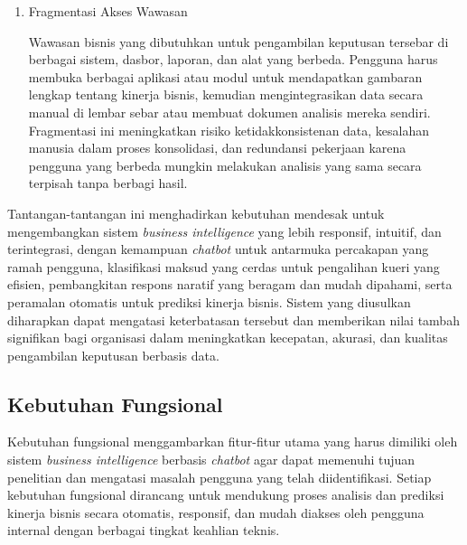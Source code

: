 \begin{enumerate}
Dasbor \textit{business intelligence} yang tersedia sering kali dirancang dengan asumsi bahwa pengguna memiliki pengetahuan teknis tentang struktur data, dimensi, metrik, dan terminologi basis data. Pengguna nonteknis, seperti manajer atau staf operasional yang tidak memiliki latar belakang teknis, sering merasa kesulitan dan kewalahan dengan berbagai tapis, daftar tarik, dan opsi yang tersedia. Antarmuka tidak intuitif, tidak mendukung kueri berbasis bahasa wajar, dan memerlukan kurva pembelajaran yang tinggi. Hal ini menyebabkan banyak pengguna potensial tidak memanfaatkan sistem \textit{business intelligence} secara optimal atau bahkan menghindari penggunaannya sama sekali.

\item Fragmentasi Akses Wawasan

Wawasan bisnis yang dibutuhkan untuk pengambilan keputusan tersebar di berbagai sistem, dasbor, laporan, dan alat yang berbeda. Pengguna harus membuka berbagai aplikasi atau modul untuk mendapatkan gambaran lengkap tentang kinerja bisnis, kemudian mengintegrasikan data secara manual di lembar sebar atau membuat dokumen analisis mereka sendiri. Fragmentasi ini meningkatkan risiko ketidakkonsistenan data, kesalahan manusia dalam proses konsolidasi, dan redundansi pekerjaan karena pengguna yang berbeda mungkin melakukan analisis yang sama secara terpisah tanpa berbagi hasil.

\end{enumerate}

Tantangan-tantangan ini menghadirkan kebutuhan mendesak untuk mengembangkan sistem \textit{business intelligence} yang lebih responsif, intuitif, dan terintegrasi, dengan kemampuan \textit{chatbot} untuk antarmuka percakapan yang ramah pengguna, klasifikasi maksud yang cerdas untuk pengalihan kueri yang efisien, pembangkitan respons naratif yang beragam dan mudah dipahami, serta peramalan otomatis untuk prediksi kinerja bisnis. Sistem yang diusulkan diharapkan dapat mengatasi keterbatasan tersebut dan memberikan nilai tambah signifikan bagi organisasi dalam meningkatkan kecepatan, akurasi, dan kualitas pengambilan keputusan berbasis data.
\subsection{Kebutuhan Fungsional}

Kebutuhan fungsional menggambarkan fitur-fitur utama yang harus dimiliki oleh sistem \textit{business intelligence} berbasis \textit{chatbot} agar dapat memenuhi tujuan penelitian dan mengatasi masalah pengguna yang telah diidentifikasi. Setiap kebutuhan fungsional dirancang untuk mendukung proses analisis dan prediksi kinerja bisnis secara otomatis, responsif, dan mudah diakses oleh pengguna internal dengan berbagai tingkat keahlian teknis.

